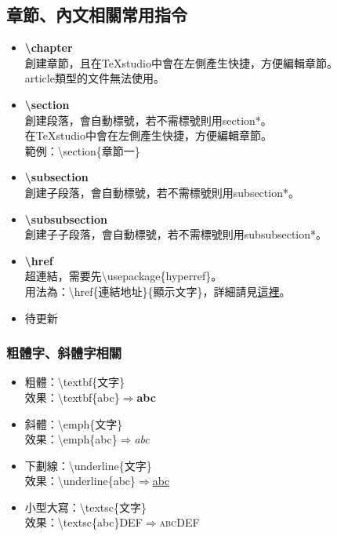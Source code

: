 \documentclass[12pt]{article}
\begin{document}
\begin{CJK*}{UTF8}{bsmi}
		\subsection{章節、內文相關常用指令}
			\begin{itemize}
				\item \textbf{\textbackslash chapter} \\
				創建章節，且在TeXstudio中會在左側產生快捷，方便編輯章節。\\
				article類型的文件無法使用。
				\item \textbf{\textbackslash section} \\
					創建段落，會自動標號，若不需標號則用section*。\\
					在TeXstudio中會在左側產生快捷，方便編輯章節。\\
					範例：\textbackslash section\{章節一\}
				\item \textbf{\textbackslash subsection} \\
					創建子段落，會自動標號，若不需標號則用subsection*。
				\item \textbf{\textbackslash subsubsection} \\
					創建子子段落，會自動標號，若不需標號則用subsubsection*。
				\item \textbf{\textbackslash href} \\
					超連結，需要先\textbackslash usepackage\{hyperref\}。 \\
					用法為：\textbackslash href\{連結地址\}\{顯示文字\}，詳細請見\href{https://www.overleaf.com/learn/latex/Hyperlinks}{這裡}。
				\item 待更新
				
			\end{itemize}
		\subsubsection{粗體字、斜體字相關}
			\begin{itemize}
				\item 粗體：\textbackslash textbf\{文字\} \\
					效果：\textbackslash textbf\{abc\}$\Rightarrow$\textbf{abc}
				\item 斜體：\textbackslash emph\{文字\} \\
					效果：\textbackslash emph\{abc\}$\Rightarrow$\emph{abc}
				\item 下劃線：\textbackslash underline\{文字\} \\
					效果：\textbackslash underline\{abc\}$\Rightarrow$\underline{abc}
					\item 小型大寫：\textbackslash textsc\{文字\} \\
					效果：\textbackslash textsc\{abc\}DEF$\Rightarrow$\textsc{abc}DEF
			\end{itemize}
		\newpage
		

\end{CJK*}
\end{document}
